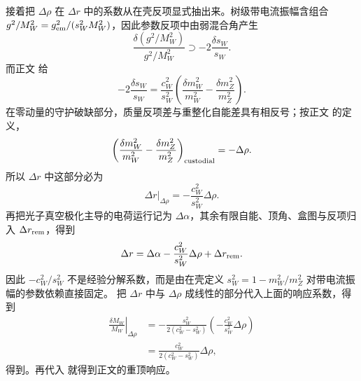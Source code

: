 \begin{derivation}
接着把 $\Delta\rho$ 在 $\Delta r$ 中的系数从在壳反项显式抽出来。树级带电流振幅含组合 $g^2/M_W^2=g_{\rm em}^2/(s_W^2M_W^2)$，因此参数反项中由弱混合角产生
\begin{equation*}
\frac{\delta(g^2/M_W^2)}{g^2/M_W^2}
\supset -2\frac{\delta s_W}{s_W}.
\end{equation*}
而正文 给
\begin{equation*}
-2\frac{\delta s_W}{s_W}
=\frac{c_W^2}{s_W^2}
\left(\frac{\delta m_W^2}{m_W^2}-\frac{\delta m_Z^2}{m_Z^2}\right).
\end{equation*}
在零动量的守护破缺部分，质量反项差与重整化自能差具有相反号；按正文 的定义，
\begin{equation*}
\left(\frac{\delta m_W^2}{m_W^2}-\frac{\delta m_Z^2}{m_Z^2}\right)_{\rm custodial}
=-\Delta\rho.
\end{equation*}
所以 $\Delta r$ 中这部分必为
\begin{equation*}
\left.\Delta r\right|_{\Delta\rho}
=-\frac{c_W^2}{s_W^2}\Delta\rho.
\end{equation*}
再把光子真空极化主导的电荷运行记为 $\Delta\alpha$，其余有限自能、顶角、盒图与反项归入 $\Delta r_{\rm rem}$，得到
\begin{equation*}
\Delta r
=\Delta\alpha-\frac{c_W^2}{s_W^2}\Delta\rho+\Delta r_{\rm rem}.
\end{equation*}
因此 $-c_W^2/s_W^2$ 不是经验分解系数，而是由在壳定义 $s_W^2=1-m_W^2/m_Z^2$ 对带电流振幅的参数依赖直接固定。
把 $\Delta r$ 中与 $\Delta\rho$ 成线性的部分代入上面的响应系数，得到
\begin{align*}
\left.\frac{\delta M_W}{M_W}\right|_{\Delta\rho}
&=-\frac{s_W^2}{2(c_W^2-s_W^2)}
\left(-\frac{c_W^2}{s_W^2}\Delta\rho\right)\\
&=\frac{c_W^2}{2(c_W^2-s_W^2)}\Delta\rho,
\end{align*}
得到。再代入 就得到正文的重顶响应。
\end{derivation}

